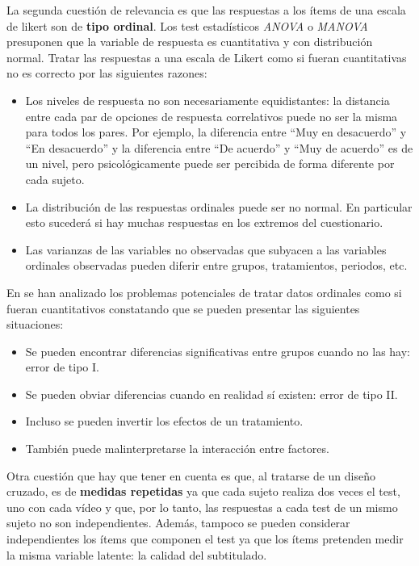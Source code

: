 \documentclass[
  12pt,
  a4paper,
  extrafontsizes,
  onecolumn,
  openright,
  table]{memoir}
\providecommand{\tightlist}{%
  \setlength{\itemsep}{0pt}\setlength{\parskip}{0pt}}\usepackage{longtable,booktabs,array}
\begin{document}
La segunda cuestión de relevancia es que las respuestas a los ítems de
una \gls{escala de likert} son de \textbf{tipo ordinal}. Los test
estadísticos \emph{\gls{ANOVA}} o \emph{\gls{MANOVA}} presuponen que la
variable de respuesta es cuantitativa y con distribución normal. Tratar
las respuestas a una escala de Likert como si fueran cuantitativas no es
correcto por las siguientes razones:

\begin{itemize}
\item
  Los niveles de respuesta no son necesariamente equidistantes: la
  distancia entre cada par de opciones de respuesta correlativos puede
  no ser la misma para todos los pares. Por ejemplo, la diferencia entre
  \enquote{Muy en desacuerdo} y \enquote{En desacuerdo} y la diferencia
  entre \enquote{De acuerdo} y \enquote{Muy de acuerdo} es de un nivel,
  pero psicológicamente puede ser percibida de forma diferente por cada
  sujeto.
\item
  La distribución de las respuestas ordinales puede ser no normal. En
  particular esto sucederá si hay muchas respuestas en los extremos del
  cuestionario.
\item
  Las varianzas de las variables no observadas que subyacen a las
  variables ordinales observadas pueden diferir entre grupos,
  tratamientos, periodos, etc.
\end{itemize}

En \textcite{kruschke2018} se han analizado los problemas potenciales de
tratar datos ordinales como si fueran cuantitativos constatando que se
pueden presentar las siguientes situaciones:

\begin{itemize}
\tightlist
\item
  Se pueden encontrar diferencias significativas entre grupos cuando no
  las hay: \gls{error de tipo I}.
\item
  Se pueden obviar diferencias cuando en realidad sí existen:
  \gls{error de tipo II}.
\item
  Incluso se pueden invertir los efectos de un tratamiento.
\item
  También puede malinterpretarse la interacción entre factores.
\end{itemize}

Otra cuestión que hay que tener en cuenta es que, al tratarse de un
diseño cruzado, es de \textbf{medidas repetidas} ya que cada sujeto
realiza dos veces el test, uno con cada vídeo y que, por lo tanto, las
respuestas a cada test de un mismo sujeto no son independientes. Además,
tampoco se pueden considerar independientes los ítems que componen el
test ya que los ítems pretenden medir la misma variable latente: la
calidad del subtitulado.
\end{document}
